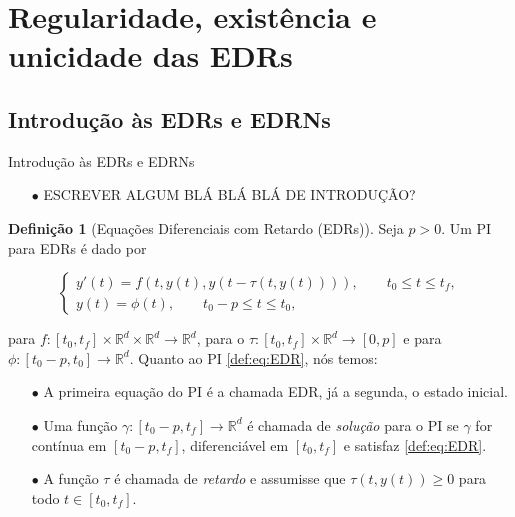 \documentclass{beamer}
\newcommand{\R}{\mathbb{R}}
\theoremstyle{plain}
\theoremstyle{definition}
\newtheorem{defi}{Definição}
\begin{document}
\section{Regularidade, existência e unicidade das EDRs}
\subsection{Introdução às EDRs e EDRNs}

\begin{frame}{Introdução às EDRs e EDRNs}
    \begin{itemize}
        \item[$\bullet$] ESCREVER ALGUM BLÁ BLÁ BLÁ DE INTRODUÇÃO?
    \end{itemize} 
\end{frame}



\begin{frame}
    
    \begin{defi}[Equações Diferenciais com Retardo (EDRs)]
    Seja $p>0$. Um PI para EDRs é dado por

    \noindent
    \begin{equation}  
        \begin{cases}
            y'(t) = f(t, y(t), y(t - \tau(t, y(t)))), \qquad t_0 \leq t \leq t_f , \\
            y(t) = \phi(t), \qquad t_0 - p \leq t \leq t_0, 
        \end{cases}
        \label{def:eq:EDR}
    \end{equation}

para $f:[t_0, t_f] \times \R^d \times \R^d \to \R^d$, para {\color{red}o}  $\tau: [t_0, t_f] \times \R^d \to [0, p]$ e para $\phi:[t_0 - p, t_0] \to \R^d $. Quanto ao PI \eqref{def:eq:EDR}, nós temos:
        
    \begin{itemize}
        \item[$\bullet$] A primeira equação do PI é a chamada EDR, já a segunda, o estado inicial.
        \item[$\bullet$] Uma função $\gamma:[t_0 - p, t_f] \to \R^d$ é chamada de \textit{solução} para o PI se $\gamma$ for contínua em $[t_0 - p, t_f]$, diferenciável em $[t_0, t_f]$ e satisfaz \eqref{def:eq:EDR}.
        \item[$\bullet$] A função $\tau$ é chamada de \textit{retardo} e assumisse que $\tau(t, y(t))\geq0$ para todo $t \in [t_0, t_f]$.

    \end{itemize}
    \end{defi}


\end{frame}
\end{document}
